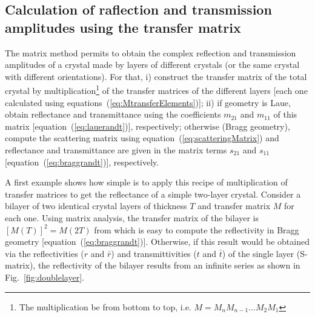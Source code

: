 \documentclass[preprint]{iucr}              %
\newcommand{\inred}[1]{{\color{red}#1}}
\begin{document}
%
\subsection{\inred{Calculation of raflection and transmission amplitudes using the transfer matrix}}

The matrix method permits to obtain the complex reflection and transmission amplitudes of a crystal made by layers of different crystals (or the same crystal with different orientations). For that,
i) construct the transfer matrix of the total crystal by multiplication\footnote{\inred{The multiplication be from bottom to top, i.e. $M=M_n M_{n-1}...M_2 M_1$}}
of the transfer matrices of the different layers [each one calculated using equations~(\ref{eq:MtransferElements})];
ii) if geometry is Laue, obtain reflectance and transmittance using the coefficients $m_{21}$ and $m_{11}$ of this matrix [equation~(\ref{eq:lauerandt})], respectively; otherwise (Bragg geometry), compute the scattering matrix using equation~(\ref{eq:scatteringMatrix}) and reflectance and transmittance are given in the matrix terms $s_{21}$ and $s_{11}$ [equation~(\ref{eq:braggrandt})], respectively.

\inred{A first example shows how simple is to apply this recipe of multiplication of transfer matrices to get the reflectance of a simple two-layer crystal. Consider}
a bilayer of two identical crystal layers of thickness $T$ and transfer matrix $M$ for each one. Using matrix analysis, the transfer matrix of the bilayer is $[M(T)]^2=M(2T)$ from which is easy to compute the reflectivity in Bragg geometry [equation~(\ref{eq:braggrandt})]. Otherwise, if this result would be obtained via the reflectivities ($r$ and $\bar{r}$) and transmittivities ($t$ and $\bar{t}$) of the single layer (S-matrix), the reflectivity of the bilayer results from an infinite series as shown in  Fig.~\ref{fig:doublelayer}.
 
\end{document}
